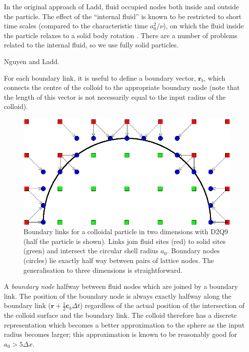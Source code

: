 In the original approach of Ladd, fluid occupied nodes both inside
and outside the particle. The effect of the ``internal fluid'' is
known to be restricted to short time scales (compared to the
characteristic time $a_0^2/\nu$), on which the fluid inside the
particle relaxes to a solid body rotation \cite{heemels}. There
are a number of problems related to the internal fluid, so we
use fully solid particles.

Nguyen and Ladd.

For each boundary link, it is useful to define a boundary vector,
$\mathbf{r}_b$, which connects the centre of the colloid to the
appropriate boundary node (note that the length of this vector is
not necessarily equal to the input radius of the colloid).


\begin{figure}[tb]
\begin{center}
\includegraphics{xfig/colloidhalflinksnew.eps}
\end{center}
\caption{Boundary links for a colloidal particle in two dimensions
with D2Q9 (half the particle is shown). Links join fluid sites (red)
to solid sites (green) and
intersect the circular shell radius $a_0$. Boundary nodes (circles)
lie exactly half way between pairs of lattice nodes. The generalisation
to three dimensions is straightforward.}
\label{fig_coll2}
\end{figure}

A \textit{boundary node} halfway between fluid nodes which are joined
by a boundary link. The position of the boundary node is always
exactly halfway along the boundary link ($\mathbf{r} + \frac{1}{2}\mathbf{c}_b
\Delta t$) regardless of the actual position of the intersection
of the colloid surface and the boundary link.
The colloid therefore has a discrete representation which becomes a
better approximation to the sphere as the input radius becomes larger;
this approximation is known to be reasonably good for $a_0 > 5\Delta x$.



